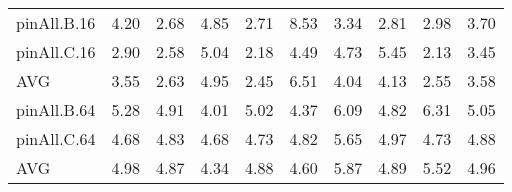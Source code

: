 \begin{table*}[]
\begin{center}
\begin{tabular}{lrrrrrrrrr}
 pinAll.B.16  & 4.20 & 2.68 & 4.85 & 2.71 & 8.53 & 3.34 & 2.81 & 2.98 & 3.70 \\
 pinAll.C.16  & 2.90 & 2.58 & 5.04 & 2.18 & 4.49 & 4.73 & 5.45 & 2.13 & 3.45 \\
 AVG          & 3.55 & 2.63 & 4.95 & 2.45 & 6.51 & 4.04 & 4.13 & 2.55 & 3.58 \\
 pinAll.B.64  & 5.28 & 4.91 & 4.01 & 5.02 & 4.37 & 6.09 & 4.82 & 6.31 & 5.05 \\
 pinAll.C.64  & 4.68 & 4.83 & 4.68 & 4.73 & 4.82 & 5.65 & 4.97 & 4.73 & 4.88 \\
 AVG          & 4.98 & 4.87 & 4.34 & 4.88 & 4.60 & 5.87 & 4.89 & 5.52 & 4.96 \\
\hline
\end{tabular}
\end{center}
\end{table*}
